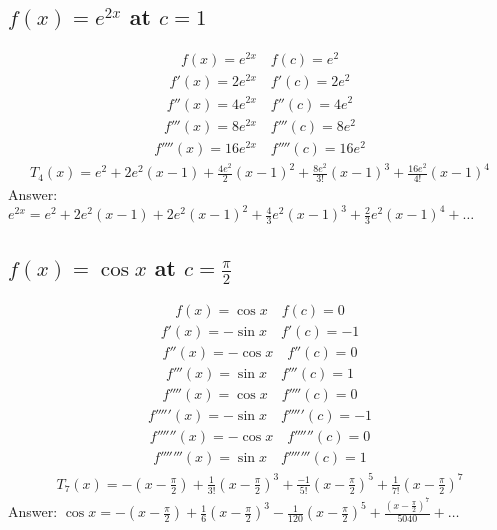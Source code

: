 \documentclass{article}
\begin{document}
\subsection{$f(x) = e^{2x}$ at $c = 1$}
\begin{align*}
	f(x) = e^{2x} \quad f(c) = e^2
\end{align*}
\begin{align*}
	f'(x) = 2e^{2x} \quad f'(c) = 2e^2
\end{align*}
\begin{align*}
	f''(x) = 4e^{2x} \quad f''(c) = 4e^2
\end{align*}
\begin{align*}
	f'''(x) = 8e^{2x} \quad f'''(c) = 8e^2
\end{align*}
\begin{align*}
	f''''(x) = 16e^{2x} \quad f''''(c) = 16e^2
\end{align*}
\begin{align*}
	T_4(x) = e^2 + 2e^2 (x - 1) + \frac{4e^2}{2} (x - 1)^2 + \frac{8e^2}{3!} (x - 1)^3 + \frac{16e^2}{4!} (x - 1)^4
\end{align*}
Answer: $e^{2x} = e^2 + 2e^2 (x - 1) + 2e^2 (x - 1)^2 + \frac{4}{3}e^2 (x - 1)^3 + \frac{2}{3} e^2 (x - 1)^4 + \dots$

\subsection{$f(x) = \cos{x}$ at $c = \frac{\pi}{2}$}
\begin{align*}
	f(x) = \cos{x} \quad f(c) = 0
\end{align*}
\begin{align*}
	f'(x) = -\sin{x} \quad f'(c) = -1
\end{align*}
\begin{align*}
	f''(x) = -\cos{x} \quad f''(c) = 0
\end{align*}
\begin{align*}
	f'''(x) = \sin{x} \quad f'''(c) = 1
\end{align*}
\begin{align*}
	f''''(x) = \cos{x} \quad f''''(c) = 0
\end{align*}
\begin{align*}
	f'''''(x) = -\sin{x} \quad f'''''(c) = -1
\end{align*}
\begin{align*}
	f''''''(x) = -\cos{x} \quad f''''''(c) = 0
\end{align*}
\begin{align*}
	f'''''''(x) = \sin{x} \quad f'''''''(c) = 1
\end{align*}
\begin{align*}
	T_7(x) = -(x - \frac{\pi}{2}) + \frac{1}{3!} (x - \frac{\pi}{2})^3 + \frac{-1}{5!} (x - \frac{\pi}{2})^5 + \frac{1}{7!} (x - \frac{\pi}{2})^7
\end{align*}
Answer: $\cos{x} = - \left( x - \frac{\pi}{2} \right) + \frac{1}{6} \left( x - \frac{\pi}{2} \right)^3 - \frac{1}{120} \left( x - \frac{\pi}{2} \right)^5 + \frac{\left( x - \frac{\pi}{2} \right)^7}{5040} + \dots$
\end{document}

